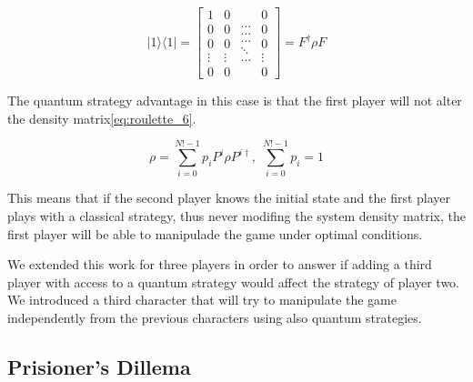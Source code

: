 \begin{equation}
\label{eq:roulette_5}
\vert1\rangle\langle1\vert=\left[\begin{array}{c}
1\\
0\\
0\\
\vdots\\
0
\end{array}\begin{array}{c}
0\\
0\\
0\\
\vdots\\
0
\end{array}\begin{array}{c}
\ldots\\
\ldots\\
\ldots\\
\ddots\\
\ldots
\end{array}\begin{array}{c}
0\\
0\\
0\\
\vdots\\
0
\end{array}\right]=F^{\dagger}\rho F
\end{equation}


The quantum strategy advantage in this case is that the first player
will not alter the density matrix\ref{eq:roulette_6}.

\begin{equation}
\label{eq:roulette_6}
\rho=\sum_{i=0}^{N!-1}p_{i}P^{i}\rho P^{i\dagger},\;\sum_{i=0}^{N!-1}p_{i}=1
\end{equation}

This means that if the second player knows the initial state and the first player plays with a classical strategy, thus never modifing the system density matrix, the first player will be able to manipulade the game under optimal conditions.


We extended this work for three players in order to answer if adding a third player with access to a quantum strategy would affect the strategy of player two. We introduced a third character that will try to manipulate the game independently from the previous characters using also quantum strategies. 


\subsection{Prisioner's Dillema}
\label{sebsec:related_work_prisioners_dillama}

